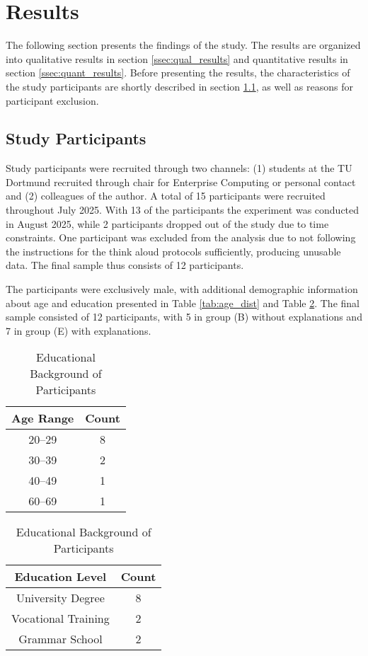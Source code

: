 \section{Results} \label{sec:results}

The following section presents the findings of the study. The results are organized into qualitative results in section \ref{ssec:qual_results} and quantitative results in section \ref{ssec:quant_results}. Before presenting the results, the characteristics of the study participants are shortly described in section \ref{ssec:study_participants}, as well as reasons for participant exclusion.

\subsection{Study Participants} \label{ssec:study_participants}

Study participants were recruited through two channels: (1) students at the TU Dortmund recruited through chair for Enterprise Computing or personal contact and (2) colleagues of the author. A total of 15 participants were recruited throughout July 2025. With 13 of the participants the experiment was conducted in August 2025, while 2 participants dropped out of the study due to time constraints. One participant was excluded from the analysis due to not following the instructions for the think aloud protocols sufficiently, producing unusable data. The final sample thus consists of 12 participants.

The participants were exclusively male, with additional demographic information about age and education presented in Table \ref{tab:age_dist} and Table \ref{tab:edu_bg}. The final sample consisted of 12 participants, with 5 in group (B) without explanations and 7 in group (E) with explanations.

\begingroup
\tablespacing

\begin{table}[ht]
    \parbox{.45\linewidth}{
        \centering
        \begin{tabular}{cc}
            Age Range & Count \\
            \hline
            20--29 & 8 \\
            30--39 & 2 \\
            40--49 & 1 \\
            60--69 & 1
        \end{tabular}
        \caption{Age Distribution of Participants}
        \label{tab:age_dist}
    }
    \hfill
    \parbox{.45\linewidth}{
        \begin{tabular}{cc}
            Education Level & Count \\
            \hline
            University Degree & 8 \\
            Vocational Training & 2 \\
            Grammar School & 2
        \end{tabular}
        \caption{Educational Background of Participants}
        \label{tab:edu_bg}
    }
\end{table}

